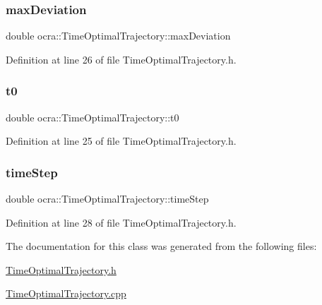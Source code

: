 \subsubsection{\texorpdfstring{max\+Deviation}{maxDeviation}}
{\footnotesize\ttfamily double ocra\+::\+Time\+Optimal\+Trajectory\+::max\+Deviation\hspace{0.3cm}{\ttfamily [protected]}}



Definition at line 26 of file Time\+Optimal\+Trajectory.\+h.

\hypertarget{classocra_1_1TimeOptimalTrajectory_a7c58d1493c4227bb5d209de36ade154e}{}\label{classocra_1_1TimeOptimalTrajectory_a7c58d1493c4227bb5d209de36ade154e} 
\subsubsection{\texorpdfstring{t0}{t0}}
{\footnotesize\ttfamily double ocra\+::\+Time\+Optimal\+Trajectory\+::t0\hspace{0.3cm}{\ttfamily [protected]}}



Definition at line 25 of file Time\+Optimal\+Trajectory.\+h.

\hypertarget{classocra_1_1TimeOptimalTrajectory_aacee4e110122959c3f47c07a9b7796bf}{}\label{classocra_1_1TimeOptimalTrajectory_aacee4e110122959c3f47c07a9b7796bf} 
\subsubsection{\texorpdfstring{time\+Step}{timeStep}}
{\footnotesize\ttfamily double ocra\+::\+Time\+Optimal\+Trajectory\+::time\+Step\hspace{0.3cm}{\ttfamily [protected]}}



Definition at line 28 of file Time\+Optimal\+Trajectory.\+h.



The documentation for this class was generated from the following files\+:\begin{DoxyCompactItemize}
\item 
\hyperlink{TimeOptimalTrajectory_8h}{Time\+Optimal\+Trajectory.\+h}\item 
\hyperlink{TimeOptimalTrajectory_8cpp}{Time\+Optimal\+Trajectory.\+cpp}\end{DoxyCompactItemize}
